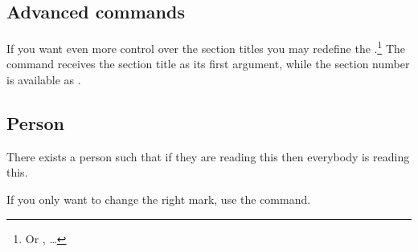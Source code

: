 \subsection{Advanced commands}

If you want even more control over the section titles you may redefine the
.\footnote{Or ,  \ldots} The
command receives the section title as its first argument, while the section
number is available as .
\begin{example}[standalone, paperheight=4cm]
\geometry{includehead, includefoot, headsep=.5em, footskip=1em} %
\sloppy %
\usepackage{fancyhdr}%
\usepackage{extramarks}%
\pagestyle{fancy}%
\fancyhead[R]{\firstleftmark}

\section{Person}
There exists a person such that
if they are reading this then
everybody is reading this.
\end{example}
If you only want to change the right mark, use the  command.

